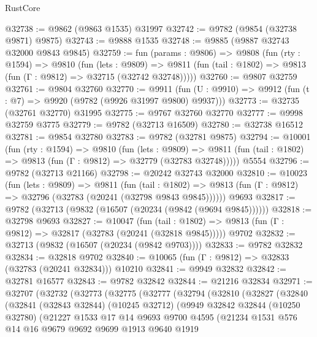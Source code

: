 \begin{lexlean}{RustCore}
\begin{coremodule}
@32738 := @9862 (@9863 @1535) @31997
@32742 := @9782 (@9854 (@32738 @9871) @9875)
@32743 := @9888 @1535
@32748 := @9885 (@9887 @32743 @32000 @9843 @9845)
@32759 := fun (params : @9806) =>
  @9808
    (fun (rty : @1594) =>
    @9810
      (fun (lets : @9809) =>
      @9811 (fun (tail : @1802) => @9813 (fun (Γ : @9812) => @32715 (@32742 @32748)))))
@32760 := @9807 @32759
@32761 := @9804 @32760
@32770 := @9911
    (fun (U : @9910) => @9912 (fun (t : @7) => @9920 (@9782 (@9926 @31997 @9800) @9937)))
@32773 := @32735 (@32761 @32770) @31995
@32775 := @9767 @32760 @32770
@32777 := @9998 @32759 @3775
@32779 := @9782 (@32713 @16509)
@32780 := @32738 @16512
@32781 := @9854 @32780
@32783 := @9782 (@32781 @9875)
@32794 := @10001
    (fun (rty : @1594) =>
    @9810
      (fun (lets : @9809) =>
      @9811 (fun (tail : @1802) => @9813 (fun (Γ : @9812) => @32779 (@32783 @32748)))))
    @5554
@32796 := @9782 (@32713 @21166)
@32798 := @20242 @32743 @32000
@32810 := @10023
    (fun (lets : @9809) =>
    @9811
      (fun (tail : @1802) =>
      @9813 (fun (Γ : @9812) => @32796 (@32783 (@20241 (@32798 @9843 @9845))))))
    @9693
@32817 := @9782 (@32713 (@9832 (@16507 (@20234 (@9842 (@9694 @9845))))))
@32818 := @32798 @9693
@32827 := @10047
    (fun (tail : @1802) => @9813 (fun (Γ : @9812) => @32817 (@32783 (@20241 (@32818 @9845)))))
    @9702
@32832 := @32713 (@9832 (@16507 (@20234 (@9842 @9703))))
@32833 := @9782 @32832
@32834 := @32818 @9702
@32840 := @10065 (fun (Γ : @9812) => @32833 (@32783 (@20241 @32834))) @10210
@32841 := @9949 @32832
@32842 := @32781 @16577
@32843 := @9782 @32842
@32844 := @21216 @32834
@32971 := @32707
    (@32732
      (@32773
        (@32775
          (@32777
            (@32794
              (@32810
                (@32827
                  (@32840
                    (@32841
                      (@32843 @32844)
                      (@10245 @32712)
                      (@9949
                        @32842
                        @32844
                        (@10250 @32780)
                        (@21227
                          @1533
                          @17
                          @14
                          @9693
                          @9700
                          @4595
                          (@21234
                            @1531
                            @576
                            @14
                            @16
                            @9679
                            @9692
                            @9699
                            @1913
                            @9640
                            @1919

\end{coremodule}
\end{lexlean}
